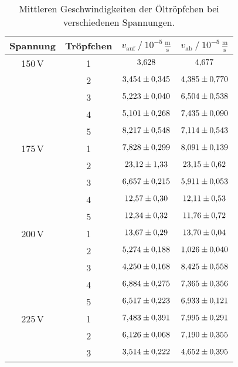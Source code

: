 \begin{table}[H]
    \centering
    \caption{Mittleren Geschwindigkeiten der Öltröpfchen bei verschiedenen Spannungen.}
    \label{tab:v_m}
    \begin{tabular}{S S S S}
        \toprule
        {Spannung} & {Tröpfchen} & {$v_{\text{auf}} \mathbin{/} 10^{-5}\,\frac{\unit{\metre}}{\unit{\second}}$} %
        & {$v_{\text{ab}} \mathbin{/} 10^{-5}\,\frac{\unit{\metre}}{\unit{\second}}$}\\
        \midrule
        {150\,V}    & 1 &   $\num{3.628+-0.000}$ & $\num{4.677+-0.000}$ \\
        {}          & 2 &   $\num{3.454+-0.345}$ & $\num{4.385+-0.770}$ \\   
        {}          & 3 &   $\num{5.223+-0.040}$ & $\num{6.504+-0.538}$ \\ 
        {}          & 4 &   $\num{5.101+-0.268}$ & $\num{7.435+-0.090}$ \\ 
        {}          & 5 &   $\num{8.217+-0.548}$ & $\num{7.114+-0.543}$ \\
        {175\,V}    & 1 &   $\num{7.828+-0.299}$ & $\num{8.091+-0.139}$ \\   
        {}          & 2 &   $\num{23.12+-1.33 }$ & $\num{23.15+-0.62 }$ \\
        {}          & 3 &   $\num{6.657+-0.215}$ & $\num{5.911+-0.053}$ \\
        {}          & 4 &   $\num{12.57+-0.30 }$ & $\num{12.11+-0.53 }$ \\
        {}          & 5 &   $\num{12.34+-0.32 }$ & $\num{11.76+-0.72 }$ \\
        {200\,V}    & 1 &   $\num{13.67+-0.29 }$ & $\num{13.70+-0.04 }$ \\
        {}          & 2 &   $\num{5.274+-0.188}$ & $\num{1.026+-0.040}$ \\
        {}          & 3 &   $\num{4.250+-0.168}$ & $\num{8.425+-0.558}$ \\
        {}          & 4 &   $\num{6.884+-0.275}$ & $\num{7.365+-0.356}$ \\
        {}          & 5 &   $\num{6.517+-0.223}$ & $\num{6.933+-0.121}$ \\
        {225\,V}    & 1 &   $\num{7.483+-0.391}$ & $\num{7.995+-0.291}$ \\
        {}          & 2 &   $\num{6.126+-0.068}$ & $\num{7.190+-0.355}$ \\
        {}          & 3 &   $\num{3.514+-0.222}$ & $\num{4.652+-0.395}$ \\

\end{tabular}
\end{table}
